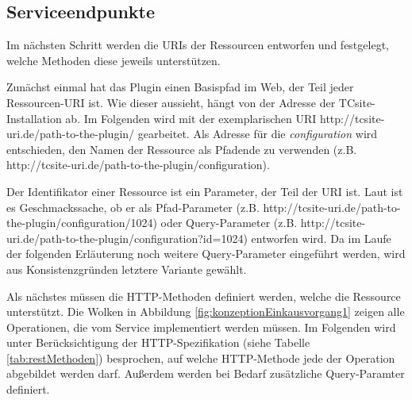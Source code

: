 \documentclass[11pt, a4paper, titlepage, listof=totoc, bibliography=totoc, index=totoc, twoside, openright, headings=normal]{scrreprt}
\begin{document}
\subsection{Serviceendpunkte}
Im nächsten Schritt werden die URIs der Ressourcen entworfen und festgelegt, welche Methoden diese jeweils unterstützen.

Zunächst einmal hat das Plugin einen Basispfad im Web, der Teil jeder Ressourcen-URI ist. Wie dieser aussieht, hängt von der Adresse der TCsite-Installation ab. Im Folgenden wird mit der exemplarischen URI \glqq http://tcsite-uri.de/path-to-the-plugin/\grqq{} gearbeitet. Als Adresse für die \emph{configuration} wird entschieden, den Namen der Ressource als Pfadende zu verwenden (z.B. \glqq http://tcsite-uri.de/path-to-the-plugin/configuration\grqq{}).

Der Identifikator einer Ressource ist ein Parameter, der Teil der URI ist. Laut \citet{tilkov11} ist es Geschmackssache, ob er als Pfad-Parameter (z.B. \glqq http://tcsite-uri.de/path-to-the-plugin/configuration/1024\grqq{}) oder Query-Parameter (z.B. \glqq http://tcsite-uri.de/path-to-the-plugin/configuration?id=1024\grqq{}) entworfen wird. Da im Laufe der folgenden Erläuterung noch weitere Query-Parameter eingeführt werden, wird aus Konsistenzgründen letztere Variante gewählt.

Als nächstes müssen die HTTP-Methoden definiert werden, welche die Ressource unterstützt. Die Wolken in Abbildung \ref{fig:konzeptionEinkausvorgang1} zeigen alle Operationen, die vom Service implementiert werden müssen. Im Folgenden wird unter Berücksichtigung der HTTP-Spezifikation (siehe Tabelle \ref{tab:restMethoden}) besprochen, auf welche HTTP-Methode jede der Operation abgebildet werden darf. Außerdem werden bei Bedarf zusätzliche Query-Paramter definiert.
\end{document}
